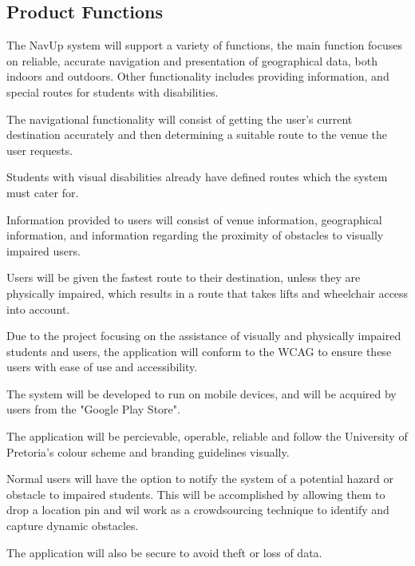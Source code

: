 \documentclass{article}
\begin{document}
	\subsection{Product Functions}
		The NavUp system will support a variety of functions, the main function focuses on reliable, accurate navigation and presentation of geographical data, both indoors and outdoors. Other functionality includes providing information, and special routes for students with disabilities.
		\\ \par
		The navigational functionality will consist of getting the user's current destination accurately and then determining a suitable route to the venue the user requests.\\ \par
		Students with visual disabilities already have defined routes which the system must cater for.\\ \par
		Information provided to users will consist of venue information, geographical information, and information regarding the proximity of obstacles to visually impaired users.\\ \par
		Users will be given the fastest route to their destination, unless they are physically impaired, which results in a route that takes lifts and wheelchair access into account.\\ \par
		Due to the project focusing on the assistance of visually and physically impaired students and users, the application will conform to the WCAG to ensure these users with ease of use and accessibility.\\ \par
		The system will be developed to run on mobile devices, and will be acquired by users from the "Google Play Store".\\ \par
		The application will be percievable, operable, reliable and follow the University of Pretoria's colour scheme and branding guidelines visually.\\ \par
		Normal users will have the option to notify the system of a potential hazard or obstacle to impaired students. This will be accomplished by allowing them to drop a location pin and wil work as a crowdsourcing technique to identify and capture dynamic obstacles. \\ \par
		The application will also be secure to avoid theft or loss of data.
			
\end{document}
